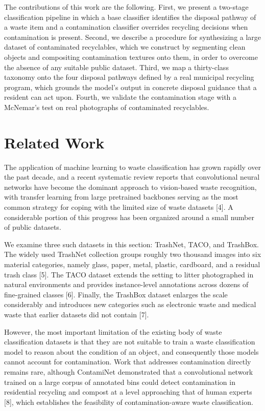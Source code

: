 \documentclass[10pt,twocolumn]{article}
\begin{document}
The contributions of this work are the following. First, we present a two-stage classification pipeline in which a base classifier identifies the disposal pathway of a waste item and a contamination classifier overrides recycling decisions when contamination is present. Second, we describe a procedure for synthesizing a large dataset of contaminated recyclables, which we construct by segmenting clean objects and compositing contamination textures onto them, in order to overcome the absence of any suitable public dataset. Third, we map a thirty-class taxonomy onto the four disposal pathways defined by a real municipal recycling program, which grounds the model's output in concrete disposal guidance that a resident can act upon. Fourth, we validate the contamination stage with a McNemar's test on real photographs of contaminated recyclables.

\section{Related Work}
The application of machine learning to waste classification has grown rapidly over the past decade, and a recent systematic review reports that convolutional neural networks have become the dominant approach to vision-based waste recognition, with transfer learning from large pretrained backbones serving as the most common strategy for coping with the limited size of waste datasets [4]. A considerable portion of this progress has been organized around a small number of public datasets.

We examine three such datasets in this section: TrashNet, TACO, and TrashBox. The widely used TrashNet collection groups roughly two thousand images into six material categories, namely glass, paper, metal, plastic, cardboard, and a residual trash class [5]. The TACO dataset extends the setting to litter photographed in natural environments and provides instance-level annotations across dozens of fine-grained classes [6]. Finally, the TrashBox dataset enlarges the scale considerably and introduces new categories such as electronic waste and medical waste that earlier datasets did not contain [7].

However, the most important limitation of the existing body of waste classification datasets is that they are not suitable to train a waste classification model to reason about the condition of an object, and consequently those models cannot account for contamination. Work that addresses contamination directly remains rare, although ContamiNet demonstrated that a convolutional network trained on a large corpus of annotated bins could detect contamination in residential recycling and compost at a level approaching that of human experts [8], which establishes the feasibility of contamination-aware waste classification.
\end{document}
